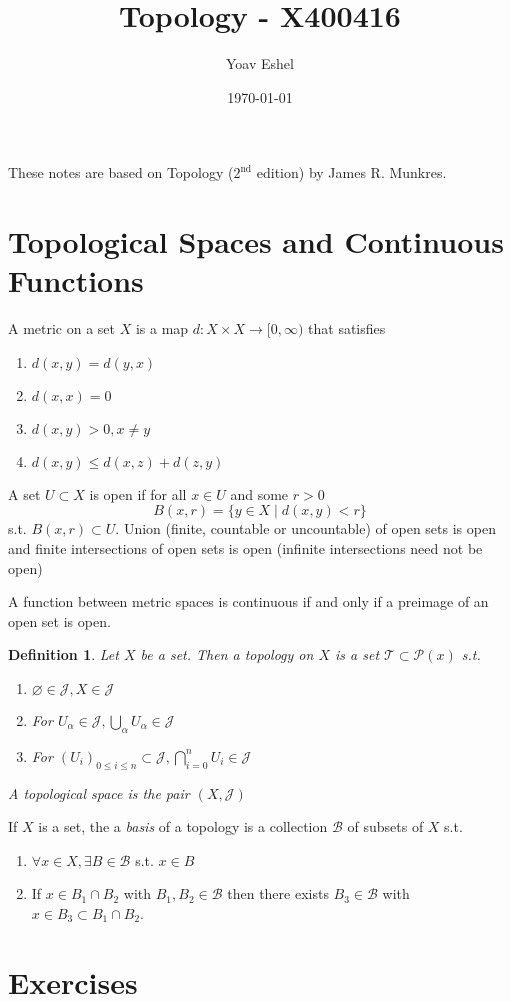 \documentclass{article}
\title{Topology - X400416}
\author{Yoav Eshel}
\date{\today}
\newtheorem*{definition}{Definition}
\theoremstyle{remark}
\begin{document}
\maketitle
\tableofcontents
\newpage
These notes are based on Topology ($2^\text{nd}$ edition) by James R. Munkres. 
\section{Topological Spaces and Continuous Functions}
A metric on a set $X$ is a map $d:X\times X \to [0,\infty)$ that satisfies
\begin{enumerate}
    \item $d(x,y)=d(y,x)$
    \item $d(x,x)=0$
    \item $d(x,y)>0, x\not=y$
    \item $d(x,y)\leq d(x,z)+d(z,y)$
\end{enumerate}
A set $U\subset X$ is open if for all $x\in U$ and some $r>0$ 
$$
    B(x,r) = \{y\in X\mid d(x,y)<r\}
$$
s.t. $B(x,r)\subset U$.
Union (finite, countable or uncountable) of open sets is open and finite intersections of open sets is open (infinite intersections need not be open)

A function between metric spaces is continuous if and only if a preimage of an open set is open. 

\begin{definition}
    Let $X$ be a set. Then a topology on $X$ is a set $\mathcal{T}\subset\mathcal{P}(x)$ s.t.
    \begin{enumerate}
        \item $\varnothing\in\mathcal{J}, X\in\mathcal{J}$
        \item For $U_{\alpha}\in\mathcal{J}, \bigcup_{\alpha}U_{\alpha}\in\mathcal{J}$
        \item For $(U_i)_{0\leq i\leq n}\subset\mathcal{J}, \bigcap_{i=0}^n U_i\in\mathcal{J}$
    \end{enumerate}
    A topological space is the pair $(X,\mathcal{J})$
\end{definition}

If $X$ is a set, the a \textit{basis} of a topology is a collection $\mathcal{B}$ of subsets of $X$ s.t.
\begin{enumerate}
    \item $\forall x\in X, \exists B\in\mathcal{B}$ s.t. $x\in B$
    \item If $x\in B_1\cap B_2$ with $B_1,B_2\in\mathcal{B}$ then there exists $B_3\in\mathcal{B}$ with $x\in B_3\subset B_1\cap B_2$.
\end{enumerate}

\newpage
\section{Exercises}

    
\end{document}

